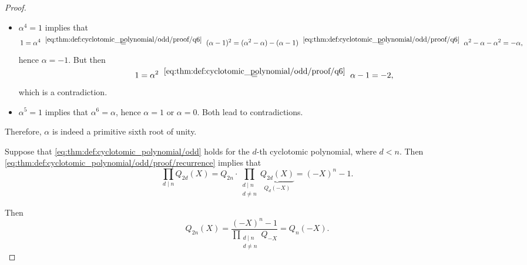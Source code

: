 \begin{proof}
\begin{itemize}
    \item \( \alpha^4 = 1 \) implies that
    \begin{equation*}
      1
      =
      \alpha^4
      \reloset {\eqref{eq:thm:def:cyclotomic_polynomial/odd/proof/q6}} =
      (\alpha - 1)^2
      =
      (\alpha^2 - \alpha) - (\alpha - 1)
      \reloset {\eqref{eq:thm:def:cyclotomic_polynomial/odd/proof/q6}} =
      \alpha^2 - \alpha - \alpha^2
      =
      -\alpha,
    \end{equation*}
    hence \( \alpha = -1 \). But then
    \begin{equation*}
      1
      =
      \alpha^2
      \reloset {\eqref{eq:thm:def:cyclotomic_polynomial/odd/proof/q6}} =
      \alpha - 1
      =
      -2,
    \end{equation*}
    which is a contradiction.

    \item \( \alpha^5 = 1 \) implies that \( \alpha^6 = \alpha \), hence \( \alpha = 1 \) or \( \alpha = 0 \). Both lead to contradictions.
  \end{itemize}

  Therefore, \( \alpha \) is indeed a primitive sixth root of unity.

   Suppose that \eqref{eq:thm:def:cyclotomic_polynomial/odd} holds for the \( d \)-th cyclotomic polynomial, where \( d < n \). Then \eqref{eq:thm:def:cyclotomic_polynomial/odd/proof/recurrence} implies that
  \begin{equation*}
    \prod_{d \mid n} Q_{2d}(X) = Q_{2n} \cdot \prod_{\substack{d \mid n \\ d \neq n}} \underbrace{Q_{2d}(X)}_{Q_d(-X)} = (-X)^n - 1.
  \end{equation*}

  Then
  \begin{equation*}
    Q_{2n}(X) = \frac {(-X)^n - 1} {\displaystyle \prod_{\substack{d \mid n \\ d \neq n}} Q_{-X}} = Q_n(-X).
  \end{equation*}
\end{proof}

